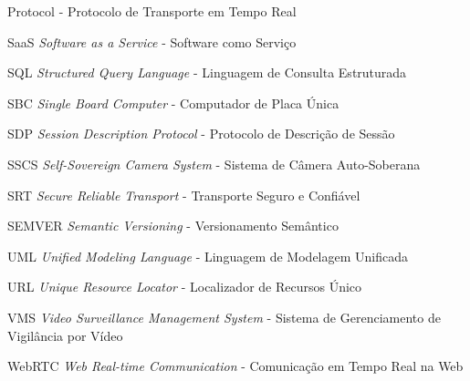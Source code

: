 \documentclass[12pt, %
openright, 
oneside, %
a4paper,    %
brazil]{facom-ufu-abntex2}
\begin{document}
\begin{siglas}
{		Protocol} - Protocolo de Transporte em Tempo Real \item[SaaS] \textit{Software
		as a Service} - Software como Serviço \item[SQL] \textit{Structured Query
		Language} - Linguagem de Consulta Estruturada \item[SBC] \textit{Single Board
		Computer} - Computador de Placa Única \item[SDP] \textit{Session Description
		Protocol} - Protocolo de Descrição de Sessão \item[SSCS] \textit{Self-Sovereign
		Camera System} - Sistema de Câmera Auto-Soberana \item[SRT] \textit{Secure
		Reliable Transport} - Transporte Seguro e Confiável  \item[SEMVER]
	\textit{Semantic Versioning} - Versionamento Semântico \item[UML]
	\textit{Unified Modeling Language} - Linguagem de Modelagem Unificada
	\item[URL] \textit{Unique Resource Locator} - Localizador de Recursos Único
	\item[VMS] \textit{Video Surveillance Management System} - Sistema de
	Gerenciamento de Vigilância por Vídeo \item[WebRTC] \textit{Web Real-time
		Communication} - Comunicação em Tempo Real na Web
\end{siglas}



\tableofcontents*
\cleardoublepage

\textual

\end{document}
